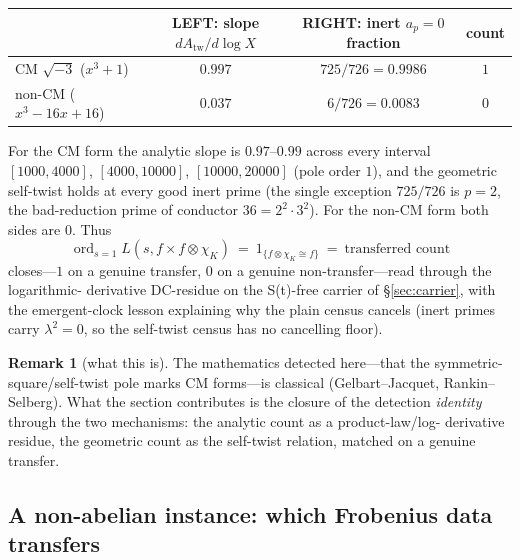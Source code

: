 \documentclass[11pt]{article}
\theoremstyle{definition}
\newtheorem{remark}[theorem]{Remark}
\newcommand{\ord}{\operatorname{ord}}
\begin{document}
\begin{center}
\begin{tabular}{lccc}
\toprule
 & LEFT: slope $dA_{\mathrm{tw}}/d\log X$ & RIGHT: inert $a_p=0$ fraction & count \\
\midrule
CM $\sqrt{-3}$ ($x^3+1$) & $0.997$ & $725/726=0.9986$ & $1$ \\
non-CM ($x^3-16x+16$) & $0.037$ & $6/726=0.0083$ & $0$ \\
\bottomrule
\end{tabular}
\end{center}

For the CM form the analytic slope is $0.97$--$0.99$ across every interval $[1000,4000]$,
$[4000,10000]$, $[10000,20000]$ (pole order $1$), and the geometric self-twist holds at every good
inert prime (the single exception $725/726$ is $p=2$, the bad-reduction prime of conductor
$36=2^2\cdot3^2$). For the non-CM form both sides are $0$. Thus
\[
  \boxed{\ \ord_{s=1}L(s,f\times f\otimes\chi_K)\ =\ 1_{\{f\otimes\chi_K\cong f\}}\ =\ \text{transferred count}\ }
\]
closes---$1$ on a genuine transfer, $0$ on a genuine non-transfer---read through the logarithmic-
derivative DC-residue on the S(t)-free carrier of \S\ref{sec:carrier}, with the emergent-clock
lesson explaining why the plain census cancels (inert primes carry $\lambda^2=0$, so the self-twist
census has no cancelling floor).

\begin{remark}[what this is]
The mathematics detected here---that the symmetric-square/self-twist pole marks CM forms---is
classical (Gelbart--Jacquet, Rankin--Selberg). What the section contributes is the closure of the
detection \emph{identity} through the two mechanisms: the analytic count as a product-law/log-
derivative residue, the geometric count as the self-twist relation, matched on a genuine transfer.
\end{remark}

\subsection{A non-abelian instance: which Frobenius data transfers}\label{sec:a4}
\end{document}
